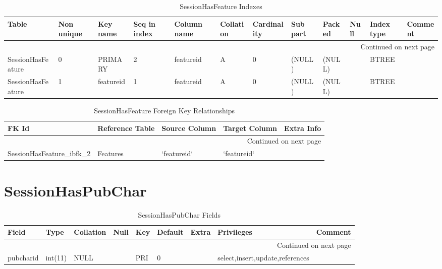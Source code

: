 \documentclass[tablesignature,landscape]{scrartcl}
\begin{document}
\begin{longtable}{|l|l|l|l|l|l|l|l|l|l|l|l|}
\caption{SessionHasFeature Indexes} \label{tbl:sessionhasfeatureindexes}\\
\hline
 Table              &  Non unique  &  Key name   &  Seq in index  &  Column name  &  Collation  &  Cardinality  &  Sub part  &  Packed  &  Null  &  Index type  &  Comment \\
\hline
\endhead
\hline\multicolumn{12}{r}{Continued on next page}\
\endfoot
\endlastfoot
\hline
 SessionHasFeature  &           0  &  PRIMARY    &             1  &  sessionid    &  A          &            0  &  (NULL)    &  (NULL)  &        &  BTREE       &           \\
 SessionHasFeature  &           0  &  PRIMARY    &             2  &  featureid    &  A          &            0  &  (NULL)    &  (NULL)  &        &  BTREE       &           \\
 SessionHasFeature  &           1  &  featureid  &             1  &  featureid    &  A          &            0  &  (NULL)    &  (NULL)  &        &  BTREE       &           \\
\hline
\end{longtable}


\begin{longtable}{|l|l|l|l|l|}
\caption{SessionHasFeature Foreign Key Relationships} \label{tbl:sessionhasfeaturefkr}\\
\hline
 FK Id                           &  Reference Table  &  Source Column  &  Target Column  &  Extra Info \\
\hline
\endhead
\hline\multicolumn{5}{r}{Continued on next page}\
\endfoot
\endlastfoot
\hline
 SessionHasFeature\_{}ibfk\_{}1  &  Sessions         &  `sessionid`    &  `sessionid`    &              \\
 SessionHasFeature\_{}ibfk\_{}2  &  Features         &  `featureid`    &  `featureid`    &              \\
\hline
\end{longtable}
\section{SessionHasPubChar}
\label{sec-27}


\begin{longtable}{|l|l|l|l|l|l|l|l|l|}
\caption{SessionHasPubChar Fields} \label{tbl:sessionhaspubcharfields}\\
\hline
 Field      &  Type     &  Collation  &  Null  &  Key  &  Default  &  Extra  &  Privileges                       &  Comment \\
\hline
\endhead
\hline\multicolumn{9}{r}{Continued on next page}\
\endfoot
\endlastfoot
\hline
 sessionid  &  int(11)  &  NULL       &        &  PRI  &        0  &         &  select,insert,update,references  &           \\
 pubcharid  &  int(11)  &  NULL       &        &  PRI  &        0  &         &  select,insert,update,references  &           \\
\hline
\end{longtable}
\end{document}
